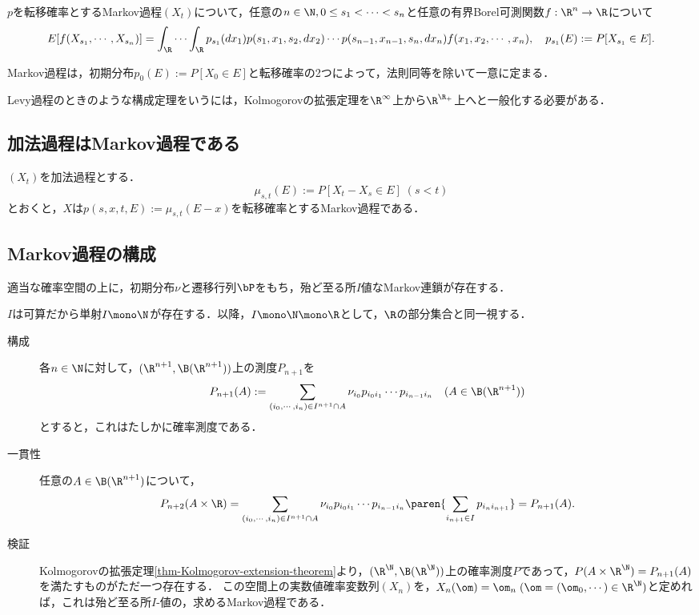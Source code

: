 \documentclass[uplatex,dvipdfmx]{jsreport}
\begin{document}
\begin{lemma}[転移確率が定めるMarkov過程]
    $p$を転移確率とするMarkov過程$(X_t)$について，任意の$n\in\N,0\le s_1<\cdots<s_n$と任意の有界Borel可測関数$f:\R^n\to\R$について
    \[E[f(X_{s_1},\cdots,X_{s_n})]=\int_\R\cdots\int_\R p_{s_1}(dx_1)p(s_1,x_1,s_2,dx_2)\cdots p(s_{n-1},x_{n-1},s_n,dx_n)f(x_1,x_2,\cdots,x_n),\quad  p_{s_1}(E):=P[X_{s_1}\in E].\]
\end{lemma}

\begin{corollary}
    Markov過程は，初期分布$p_0(E):=P[X_0\in E]$と転移確率の2つによって，法則同等を除いて一意に定まる．
\end{corollary}
\begin{remark}
    Levy過程のときのような構成定理をいうには，Kolmogorovの拡張定理を$\R^\infty$上から$\R^{\R_+}$上へと一般化する必要がある．
\end{remark}

\subsection{加法過程はMarkov過程である}

\begin{theorem}
    $(X_t)$を加法過程とする．
    \[\mu_{s,t}(E):=P[X_t-X_s\in E]\;(s<t)\]
    とおくと，$X$は$p(s,x,t,E):=\mu_{s,t}(E-x)$を転移確率とするMarkov過程である．
\end{theorem}

\subsection{Markov過程の構成}

\begin{proposition}[初期分布と転移確率による構成]
    適当な確率空間の上に，初期分布$\nu$と遷移行列$\bP$をもち，殆ど至る所$I$値なMarkov連鎖が存在する．
\end{proposition}
\begin{Proof}
    $I$は可算だから単射$I\mono\N$が存在する．以降，$I\mono\N\mono\R$として，$\R$の部分集合と同一視する．
    \begin{description}
        \item[構成] 各$n\in\N$に対して，$(\R^{n+1},\B(\R^{n+1}))$上の測度$P_{n+1}$を
        \[P_{n+1}(A):=\sum_{(i_0,\cdots,i_n)\in I^{n+1}\cap A}\nu_{i_0}p_{i_0i_1}\cdots p_{i_{n-1}i_n}\quad(A\in\B(\R^{n+1}))\]
        とすると，これはたしかに確率測度である．
        \item[一貫性] 任意の$A\in\B(\R^{n+1})$について，
        \[P_{n+2}(A\times\R)=\sum_{(i_0,\cdots,i_n)\in I^{n+1}\cap A}\nu_{i_0}p_{i_0i_1}\cdots p_{i_{n-1}i_n}\paren{\sum_{i_{n+1}\in I}p_{i_ni_{n+1}}}=P_{n+1}(A).\]
        \item[検証] Kolmogorovの拡張定理\ref{thm-Kolmogorov-extension-theorem}より，$(\R^\N,\B(\R^\N))$上の確率測度$P$であって，$P(A\times\R^\N)=P_{n+1}(A)$を満たすものがただ一つ存在する．
        この空間上の実数値確率変数列$(X_n)$を，$X_n(\om)=\om_n\;(\om=(\om_0,\cdots)\in\R^\N)$と定めれば，これは殆ど至る所$I$-値の，求めるMarkov過程である．
    \end{description}
\end{Proof}
\end{document}
